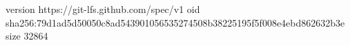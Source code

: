 version https://git-lfs.github.com/spec/v1
oid sha256:79d1ad5d50050c8ad543901056535274508b38225195f5f008e4ebd862632b3e
size 32864
